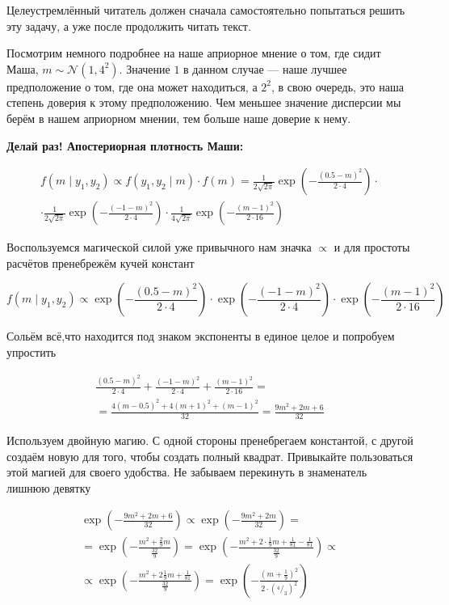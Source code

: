 \documentclass[12pt, a4paper, oneside]{extreport}
\def \mN{\mathcal{N}}
\newcommand{\fr}[2]{\ensuremath{^#1/_#2}}   %
\newcommand{\expp}[1]{ \exp \left( #1 \right)}
\theoremstyle{plain}              %
\theoremstyle{definition}         %
\begin{document}
Целеустремлённый читатель должен сначала самостоятельно попытаться решить эту задачу, а уже после продолжить читать текст.

Посмотрим немного подробнее на наше априорное мнение о том, где сидит Маша, $m \sim \mN(1, 4^2)$. Значение $1$ в данном случае --- наше лучшее предположение о том, где она может находиться, а $2^2$, в свою очередь, это наша степень доверия к этому предположению. Чем меньшее значение дисперсии мы берём в нашем априорном мнении, тем больше наше доверие к нему.

\textbf{Делай раз! Апостериорная плотность Маши:}

\begin{multline*}
f(m \mid y_1, y_2) \propto f(y_1,y_2 \mid m) \cdot f(m) = \frac{1}{2\sqrt{2\pi}}\expp{-\frac{(0.5 - m)^2}{2 \cdot 4}} \cdot \\ \cdot \frac{1}{2\sqrt{2\pi}}\expp{-\frac{(-1 - m)^2}{2 \cdot 4}} \cdot \frac{1}{4\sqrt{2\pi}}\expp{-\frac{(m-1)^2}{2 \cdot 16}}
\end{multline*} 

Воспользуемся магической силой уже привычного нам значка $\propto$ и для простоты расчётов пренебрежём кучей констант

\[ f(m \mid y_1, y_2) \propto \expp{-\frac{(0.5 - m)^2}{2 \cdot 4}} \cdot \expp{-\frac{(-1 - m)^2}{2 \cdot 4}} \cdot \expp{-\frac{(m-1)^2}{2 \cdot 16}}\]

Сольём всё,что находится под знаком экспоненты в единое целое и попробуем упростить

\begin{multline*}
 \frac{(0.5 - m)^2}{2 \cdot 4} + \frac{(-1 - m)^2}{2 \cdot 4} + \frac{(m-1)^2}{2 \cdot 16}  = \\ = \frac{ 4(m - 0.5)^2 + 4(m+1)^2 + (m-1)^2}{32} = \frac{9m^2 + 2m + 6}{32} 
\end{multline*}

Используем двойную магию. С одной стороны пренебрегаем константой, с другой создаём новую для того, чтобы создать полный квадрат. Привыкайте пользоваться этой магией для своего удобства. Не забываем перекинуть в знаменатель лишнюю девятку

\begin{multline*}
\expp{-\frac{9m^2 + 2m + 6}{32}} \propto \expp{-\frac{9m^2 + 2m}{32}}  = \\ = \expp{-\frac{m^2+\frac{2}{9} m}{\frac{32}{9}}}  = \expp{-\frac{m^2+ 2 \cdot \frac{1}{9} m + \frac{1}{81} - \frac{1}{81}}{\frac{32}{9}}} \propto  \\ \propto  \expp{-\frac{m^2+ 2 \frac{1}{9} m + \frac{1}{81}}{\frac{32}{9}}} = \expp{-\frac{(m + \frac{1}{9})^2}{2 \cdot (\fr{4}{3})^2}}
\end{multline*}
\end{document}
